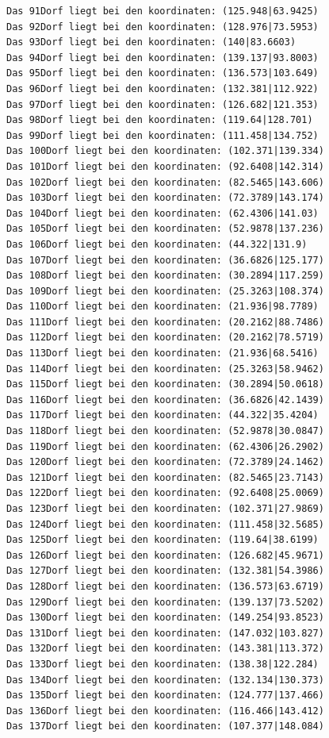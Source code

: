 \documentclass{article}
\begin{document}
\begin{verbatim}
Das 91Dorf liegt bei den koordinaten: (125.948|63.9425)
Das 92Dorf liegt bei den koordinaten: (128.976|73.5953)
Das 93Dorf liegt bei den koordinaten: (140|83.6603)
Das 94Dorf liegt bei den koordinaten: (139.137|93.8003)
Das 95Dorf liegt bei den koordinaten: (136.573|103.649)
Das 96Dorf liegt bei den koordinaten: (132.381|112.922)
Das 97Dorf liegt bei den koordinaten: (126.682|121.353)
Das 98Dorf liegt bei den koordinaten: (119.64|128.701)
Das 99Dorf liegt bei den koordinaten: (111.458|134.752)
Das 100Dorf liegt bei den koordinaten: (102.371|139.334)
Das 101Dorf liegt bei den koordinaten: (92.6408|142.314)
Das 102Dorf liegt bei den koordinaten: (82.5465|143.606)
Das 103Dorf liegt bei den koordinaten: (72.3789|143.174)
Das 104Dorf liegt bei den koordinaten: (62.4306|141.03)
Das 105Dorf liegt bei den koordinaten: (52.9878|137.236)
Das 106Dorf liegt bei den koordinaten: (44.322|131.9)
Das 107Dorf liegt bei den koordinaten: (36.6826|125.177)
Das 108Dorf liegt bei den koordinaten: (30.2894|117.259)
Das 109Dorf liegt bei den koordinaten: (25.3263|108.374)
Das 110Dorf liegt bei den koordinaten: (21.936|98.7789)
Das 111Dorf liegt bei den koordinaten: (20.2162|88.7486)
Das 112Dorf liegt bei den koordinaten: (20.2162|78.5719)
Das 113Dorf liegt bei den koordinaten: (21.936|68.5416)
Das 114Dorf liegt bei den koordinaten: (25.3263|58.9462)
Das 115Dorf liegt bei den koordinaten: (30.2894|50.0618)
Das 116Dorf liegt bei den koordinaten: (36.6826|42.1439)
Das 117Dorf liegt bei den koordinaten: (44.322|35.4204)
Das 118Dorf liegt bei den koordinaten: (52.9878|30.0847)
Das 119Dorf liegt bei den koordinaten: (62.4306|26.2902)
Das 120Dorf liegt bei den koordinaten: (72.3789|24.1462)
Das 121Dorf liegt bei den koordinaten: (82.5465|23.7143)
Das 122Dorf liegt bei den koordinaten: (92.6408|25.0069)
Das 123Dorf liegt bei den koordinaten: (102.371|27.9869)
Das 124Dorf liegt bei den koordinaten: (111.458|32.5685)
Das 125Dorf liegt bei den koordinaten: (119.64|38.6199)
Das 126Dorf liegt bei den koordinaten: (126.682|45.9671)
Das 127Dorf liegt bei den koordinaten: (132.381|54.3986)
Das 128Dorf liegt bei den koordinaten: (136.573|63.6719)
Das 129Dorf liegt bei den koordinaten: (139.137|73.5202)
Das 130Dorf liegt bei den koordinaten: (149.254|93.8523)
Das 131Dorf liegt bei den koordinaten: (147.032|103.827)
Das 132Dorf liegt bei den koordinaten: (143.381|113.372)
Das 133Dorf liegt bei den koordinaten: (138.38|122.284)
Das 134Dorf liegt bei den koordinaten: (132.134|130.373)
Das 135Dorf liegt bei den koordinaten: (124.777|137.466)
Das 136Dorf liegt bei den koordinaten: (116.466|143.412)
Das 137Dorf liegt bei den koordinaten: (107.377|148.084)

\end{verbatim}
\end{document}
